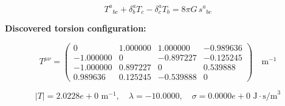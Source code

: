 
\begin{equation}
  T^a{}_{bc} + \delta^a_b T_c - \delta^a_c T_b = 8\pi G \, s^a{}_{bc}
\end{equation}

\textbf{Discovered torsion configuration:}

\begin{equation}
  T^{\mu\nu} = \begin{pmatrix}
    0 & 1.000000 & 1.000000 & -0.989636 \\
    -1.000000 & 0 & -0.897227 & -0.125245 \\
    -1.000000 & 0.897227 & 0 & 0.539888 \\
    0.989636 & 0.125245 & -0.539888 & 0
  \end{pmatrix} \quad \text{m}^{-1}
\end{equation}

\begin{equation}
  |T| = 2.0228e+0 \text{ m}^{-1}, \quad
  \lambda = -10.0000, \quad
  \sigma = 0.0000e+0 \text{ J}\cdot\text{s/m}^3
\end{equation}